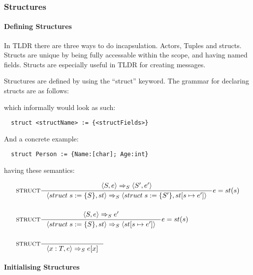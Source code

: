 \subsubsection{Structures}
\label{subsec:structs}

\paragraph{Defining Structures}
\label{sec:defStructures}

In TLDR there are three ways to do incapsulation. Actors, Tuples and structs. Structs are unique by being fully accessable within the scope, and having named fields. Structs are especially useful in TLDR for creating messages.

Structures are defined by using the \enquote{struct} keyword. The grammar for declaring structs are as follows:


which informally would look as such:

\begin{verbatim}
  struct <structName> := {<structFields>}
\end{verbatim}

And a concrete example:

\begin{verbatim}
  struct Person := {Name:[char]; Age:int}
\end{verbatim}

having these semantics:

\begin{align*}
&\inference[$\text{STRUCT}$]{\Braket{S, e} \Rightarrow_S \Braket{S', e'}}
                            {\Braket{struct\;s := \{S\}, st} \Rightarrow_S \Braket{struct\;s := \{S'\}, st[s \mapsto e']}}
                            {e=st(s)}
\\\\
&\inference[$\text{STRUCT}$]{\Braket{S, e} \Rightarrow_S e'}
                            {\Braket{struct\;s := \{S\}, st} \Rightarrow_S \Braket{st[s \mapsto e']}}
                            {e=st(s)}
\\\\
&\inference[$\text{STRUCT}$]{}
                            {\Braket{x:T, e} \Rightarrow_S e[x]}
\end{align*}

\paragraph{Initialising Structures}
\label{sec:initStructures}

